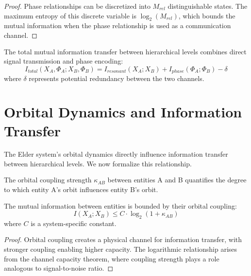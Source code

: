 \begin{proof}
Phase relationships can be discretized into $M_{rel}$ distinguishable states. The maximum entropy of this discrete variable is $\log_2(M_{rel})$, which bounds the mutual information when the phase relationship is used as a communication channel.
\end{proof}

\begin{theorem}
The total mutual information transfer between hierarchical levels combines direct signal transmission and phase encoding:
\begin{equation}
I_{total}(X_A, \Phi_A; X_B, \Phi_B) = I_{resonant}(X_A; X_B) + I_{phase}(\Phi_A; \Phi_B) - \delta
\end{equation}
where $\delta$ represents potential redundancy between the two channels.
\end{theorem}

\section{Orbital Dynamics and Information Transfer}

The Elder system's orbital dynamics directly influence information transfer between hierarchical levels. We now formalize this relationship.

\begin{definition}
The orbital coupling strength $\kappa_{AB}$ between entities A and B quantifies the degree to which entity A's orbit influences entity B's orbit.
\end{definition}

\begin{theorem}
The mutual information between entities is bounded by their orbital coupling:
\begin{equation}
I(X_A; X_B) \leq C \cdot \log_2(1 + \kappa_{AB})
\end{equation}
where $C$ is a system-specific constant.
\end{theorem}

\begin{proof}
Orbital coupling creates a physical channel for information transfer, with stronger coupling enabling higher capacity. The logarithmic relationship arises from the channel capacity theorem, where coupling strength plays a role analogous to signal-to-noise ratio.
\end{proof}

